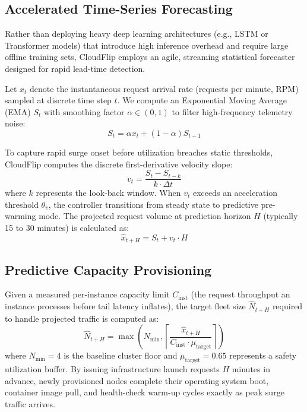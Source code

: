 \documentclass[conference]{IEEEtran}
\begin{document}
\subsection{Accelerated Time-Series Forecasting}
Rather than deploying heavy deep learning architectures (e.g., LSTM or Transformer models) that introduce high inference overhead and require large offline training sets, CloudFlip employs an agile, streaming statistical forecaster designed for rapid lead-time detection.

Let $x_t$ denote the instantaneous request arrival rate (requests per minute, RPM) sampled at discrete time step $t$. We compute an Exponential Moving Average (EMA) $S_t$ with smoothing factor $\alpha \in (0, 1)$ to filter high-frequency telemetry noise:
\begin{equation}
S_t = \alpha x_t + (1 - \alpha) S_{t-1}
\end{equation}

To capture rapid surge onset before utilization breaches static thresholds, CloudFlip computes the discrete first-derivative velocity slope:
\begin{equation}
v_t = \frac{S_t - S_{t-k}}{k \cdot \Delta t}
\end{equation}
where $k$ represents the look-back window. When $v_t$ exceeds an acceleration threshold $\theta_v$, the controller transitions from steady state to predictive pre-warming mode. The projected request volume at prediction horizon $H$ (typically 15 to 30 minutes) is calculated as:
\begin{equation}
\hat{x}_{t+H} = S_t + v_t \cdot H
\end{equation}

\subsection{Predictive Capacity Provisioning}
Given a measured per-instance capacity limit $C_{\text{inst}}$ (the request throughput an instance processes before tail latency inflates), the target fleet size $\hat{N}_{t+H}$ required to handle projected traffic is computed as:
\begin{equation}
\hat{N}_{t+H} = \max\left( N_{\min}, \left\lceil \frac{\hat{x}_{t+H}}{C_{\text{inst}} \cdot \mu_{\text{target}}} \right\rceil \right)
\end{equation}
where $N_{\min} = 4$ is the baseline cluster floor and $\mu_{\text{target}} = 0.65$ represents a safety utilization buffer. By issuing infrastructure launch requests $H$ minutes in advance, newly provisioned nodes complete their operating system boot, container image pull, and health-check warm-up cycles exactly as peak surge traffic arrives.
\end{document}
